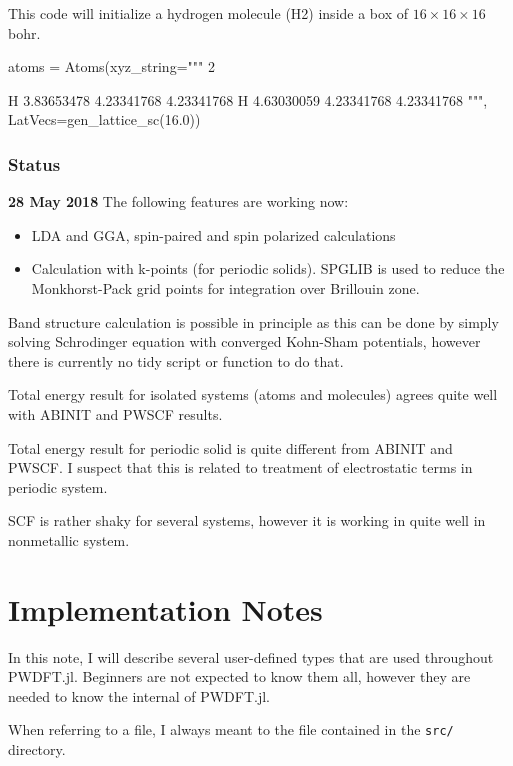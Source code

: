 \documentclass[a4paper,10pt]{paper}
\begin{document}
This code will initialize a hydrogen molecule (H2) inside a box of
$16\times16\times16$ bohr.
\begin{juliacode}
atoms = Atoms(xyz_string="""
              2
              
              H      3.83653478       4.23341768       4.23341768
              H      4.63030059       4.23341768       4.23341768
              """,
              LatVecs=gen_lattice_sc(16.0))
\end{juliacode}


\section{Status}

\textbf{28 May 2018} The following features are working now:
\begin{itemize}
\item LDA and GGA, spin-paired and spin polarized calculations
\item Calculation with k-points (for periodic solids).
  \textsf{SPGLIB} is used to reduce the Monkhorst-Pack grid points
  for integration over Brillouin zone.
\end{itemize}

Band structure calculation is possible in principle as this can be
done by simply solving
Schrodinger equation with converged Kohn-Sham potentials, however there
is currently no tidy script or function to do that.

Total energy result for isolated systems (atoms and molecules) agrees quite
well with ABINIT and PWSCF results.

Total energy result for periodic solid is quite different from ABINIT and PWSCF.
I suspect that this is related to treatment of electrostatic terms in periodic system.

SCF is rather shaky for several systems, however it is working in quite well in nonmetallic
system.

\part{Implementation Notes}

In this note, I will describe several user-defined types that are
used throughout \textsf{PWDFT.jl}. Beginners are not expected to know them
all, however they are needed to know the internal of \textsf{PWDFT.jl}.

When referring to a file, I always meant to the file contained in
the \texttt{src/} directory.
\end{document}
